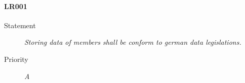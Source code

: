 \paragraph{LR001}
  \begin{description}
  \item [Statement] 
  \textit{ Storing data of members shall be conform to german data legislations.}
  \item [Priority] \textit{A}
\end{description}
